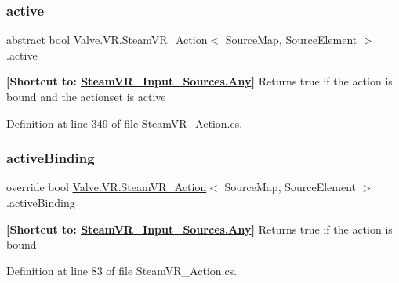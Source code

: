 \subsubsection{\texorpdfstring{active}{active}\hspace{0.1cm}{\footnotesize\ttfamily [2/2]}}
{\footnotesize\ttfamily abstract bool \mbox{\hyperlink{class_valve_1_1_v_r_1_1_steam_v_r___action}{Valve.\+V\+R.\+Steam\+V\+R\+\_\+\+Action}}$<$ Source\+Map, Source\+Element $>$.active\hspace{0.3cm}{\ttfamily [get]}}



{\bfseries{\mbox{[}Shortcut to\+: \mbox{\hyperlink{namespace_valve_1_1_v_r_a82e5bf501cc3aa155444ee3f0662853faed36a1ef76a59ee3f15180e0441188ad}{Steam\+V\+R\+\_\+\+Input\+\_\+\+Sources.\+Any}}\mbox{]}}} Returns true if the action is bound and the actionset is active 



Definition at line 349 of file Steam\+V\+R\+\_\+\+Action.\+cs.

\mbox{\label{class_valve_1_1_v_r_1_1_steam_v_r___action_ad275cb288073b48f2b0e92a4cc797014}} 
\subsubsection{\texorpdfstring{activeBinding}{activeBinding}\hspace{0.1cm}{\footnotesize\ttfamily [1/2]}}
{\footnotesize\ttfamily override bool \mbox{\hyperlink{class_valve_1_1_v_r_1_1_steam_v_r___action}{Valve.\+V\+R.\+Steam\+V\+R\+\_\+\+Action}}$<$ Source\+Map, Source\+Element $>$.active\+Binding\hspace{0.3cm}{\ttfamily [get]}}



{\bfseries{\mbox{[}Shortcut to\+: \mbox{\hyperlink{namespace_valve_1_1_v_r_a82e5bf501cc3aa155444ee3f0662853faed36a1ef76a59ee3f15180e0441188ad}{Steam\+V\+R\+\_\+\+Input\+\_\+\+Sources.\+Any}}\mbox{]}}} Returns true if the action is bound 



Definition at line 83 of file Steam\+V\+R\+\_\+\+Action.\+cs.

